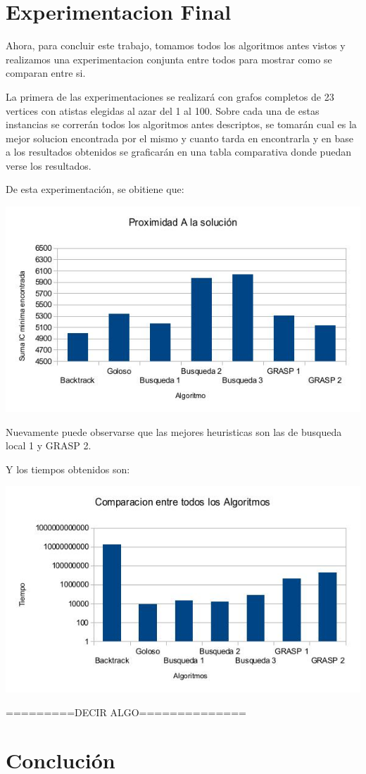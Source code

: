 \section{Experimentacion Final}
Ahora, para concluir este trabajo, tomamos todos los algoritmos antes vistos y realizamos una experimentacion conjunta entre todos para mostrar como se comparan entre si.

La primera de las experimentaciones se realizará con grafos completos de 23 vertices con atistas elegidas al azar del 1 al 100. Sobre cada una de estas instancias se correrán todos los algoritmos antes descriptos, se tomarán cual es la mejor solucion encontrada por el mismo y cuanto tarda en encontrarla y en base a los resultados obtenidos se graficarán en una tabla comparativa donde puedan verse los resultados.

De esta experimentación, se obitiene que:

\includegraphics[scale=0.5]{Con/result.jpg}

Nuevamente puede observarse que las mejores heuristicas son las de busqueda local 1 y GRASP 2.

Y los tiempos obtenidos son:

\includegraphics[scale=0.5]{Con/tiempos.jpg}

=========DECIR ALGO==============

\section{Conclución}

